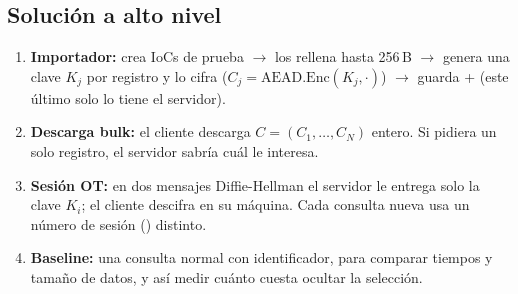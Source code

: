 \subsection{Soluci\'on a alto nivel}
\begin{enumerate}
\item \textbf{Importador:} crea IoCs de prueba $\to$ los rellena hasta 256\,B
$\to$ genera una clave $K_j$ por registro y lo cifra
($C_j=\mathrm{AEAD.Enc}(K_j,\cdot)$) $\to$ guarda
 +  (este \'ultimo solo lo tiene el servidor).
\item \textbf{Descarga bulk:} el cliente descarga $C=(C_1,\dots,C_N)$ entero.
Si pidiera un solo registro, el servidor sabr\'ia cu\'al le interesa.
\item \textbf{Sesi\'on OT:} en dos mensajes Diffie-Hellman el servidor le
entrega solo la clave $K_i$; el cliente descifra en su m\'aquina. Cada
consulta nueva usa un n\'umero de sesi\'on () distinto.
\item \textbf{Baseline:} una consulta normal
 con identificador, para comparar tiempos y tama\~no de
datos, y as\'i medir cu\'anto cuesta ocultar la selecci\'on.
\end{enumerate}

\begin{center}
\small
{}
\end{center}
